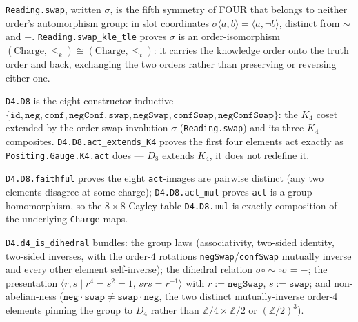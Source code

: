 \begin{proposition}\label{thm:swap-kle-tle}\leanok{}
\texttt{Reading.swap}, written $\sigma$, is the fifth symmetry of FOUR that belongs to neither
order's automorphism group: in slot coordinates $\sigma\langle a,b\rangle = \langle a, \neg
b\rangle$, distinct from $\sim$ and $-$. \texttt{Reading.swap\_kle\_tle} proves $\sigma$ is an
order-isomorphism $(\mathrm{Charge},\le_k) \cong (\mathrm{Charge},\le_t)$: it carries the knowledge
order onto the truth order and back, exchanging the two orders rather than preserving or reversing
either one.
\end{proposition}
\begin{proposition}\label{thm:d8-carrier}\leanok{}
\texttt{D4.D8} is the eight-constructor inductive $\{\texttt{id}, \texttt{neg}, \texttt{conf},
\texttt{negConf}, \texttt{swap}, \texttt{negSwap}, \texttt{confSwap}, \texttt{negConfSwap}\}$: the
$K_4$ coset extended by the order-swap involution $\sigma$ (\texttt{Reading.swap}) and its three
$K_4$-composites. \texttt{D4.D8.act\_extends\_K4} proves the first four elements act exactly as
\texttt{Positing.Gauge.K4.act} does --- $D_8$ extends $K_4$, it does not redefine it.
\end{proposition}
\begin{theorem}\label{thm:d8-faithful-hom}\leanok{}
\texttt{D4.D8.faithful} proves the eight \texttt{act}-images are pairwise distinct (any two
elements disagree at some charge); \texttt{D4.D8.act\_mul} proves \texttt{act} is a group
homomorphism, so the $8\times 8$ Cayley table \texttt{D4.D8.mul} is exactly composition of the
underlying \texttt{Charge} maps.
\end{theorem}
\begin{theorem}\label{thm:d4-is-dihedral}\leanok{}
\texttt{D4.d4\_is\_dihedral} bundles: the group laws (associativity, two-sided identity, two-sided
inverses, with the order-4 rotations \texttt{negSwap}/\texttt{confSwap} mutually inverse and every
other element self-inverse); the dihedral relation $\sigma\circ{\sim}\circ\sigma = -$; the
presentation $\langle r, s \mid r^4 = s^2 = 1,\, srs = r^{-1}\rangle$ with $r := \texttt{negSwap}$,
$s := \texttt{swap}$; and non-abelian-ness ($\texttt{neg}\cdot\texttt{swap} \ne
\texttt{swap}\cdot\texttt{neg}$, the two distinct mutually-inverse order-4 elements pinning the
group to $D_4$ rather than $\mathbb{Z}/4\times\mathbb{Z}/2$ or $(\mathbb{Z}/2)^3$).
\end{theorem}
